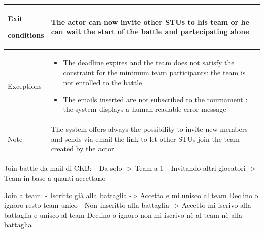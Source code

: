 \begin{center}
\begin{tabular}{| m{2cm} | m{10cm}|}
        Exit \par conditions  & The actor can now invite other STUs to his team or he can wait the start of the battle and partecipating alone                                   \\ \hline
        Exceptions            & \begin{itemize}
                                    \item The deadline expires and the team does not satisfy the constraint for the minimum team participants: the team is not enrolled to the battle
                                    \item The emails inserted are not subscribed to the tournament : the system displays a human-readable error message
                                \end{itemize} \\ \hline
        Note                  & The system offers always the possibility to invite new members and sends via email the link to let other STUs join the team created by the actor \\ \hline
    \end{tabular}
\end{center}

Join battle da mail di CKB: 
   - Da solo -> Team a 1
   - Invitando altri giocatori -> Team in base a quanti accettano

Join a team:
   - Iscritto già alla battaglia -> Accetto e mi unisco al team
                                    Declino o ignoro resto team unico 
   - Non inscritto alla battaglia -> Accetto mi iscrivo alla battaglia e unisco al team                                 
                                     Declino o ignoro non mi iscrivo nè al team nè alla battaglia


